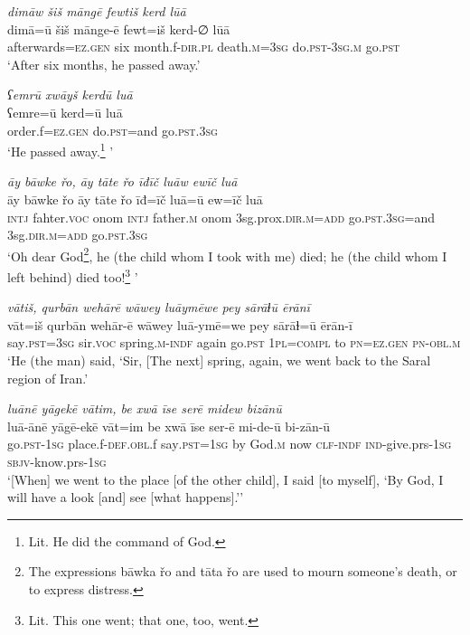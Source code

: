 \ea \label{ZQ.30}
\textit{dimāw šiš māngē fewtiš kerd lūā} \\ 
\gll dimā=ū šiš mānge-ē fewt=iš kerd-∅ lūā \\ 
 afterwards\textsc{=ez.gen} six month.f\textsc{-dir}\textsc{.pl} death\textsc{.m}\textsc{=3sg} do\textsc{.pst}\textsc{-3sg}\textsc{.m} go\textsc{.pst} \\ 
\glt `After six months, he passed away.'
\z 
 
\ea \label{ZQ.31}
\textit{ʕemrū xwāyš kerdū luā} \\ 
\gll ʕemre=ū kerd=ū luā \\ 
 order.f\textsc{=ez.gen} do\textsc{.pst}=and go\textsc{.pst}\textsc{.3sg} \\ 
\glt `He passed away.\footnote{Lit. He did the command of God.} '
\z 
 
\ea \label{ZQ.32}
\textit{āy bāwke řo, āy tāte řo īđīč luāw ewīč luā} \\ 
\gll āy bāwke řo āy tāte řo īđ=īč luā=ū ew=īč luā \\ 
 \textsc{intj} fahter.\textsc{voc} onom \textsc{intj} father\textsc{.m} onom 3sg.prox\textsc{.dir}\textsc{.m}\textsc{=add} go\textsc{.pst}\textsc{.3sg}=and 3sg\textsc{.dir}\textsc{.m}\textsc{=add} go\textsc{.pst}\textsc{.3sg} \\ 
\glt `Oh dear God\footnote{The expressions bāwka řo and tāta řo are used to mourn someone’s death, or to express distress.}, he (the child whom I took with me) died; he (the child whom I left behind) died too!\footnote{Lit. This one went; that one, too, went.} '
\z 
 
\ea \label{ZQ.33}
\textit{vātiš, qurbān wehārē wāwey luāymēwe pey sārāɫū ērānī} \\ 
\gll vāt=iš qurbān wehār-ē wāwey luā-ymē=we pey sārāɫ=ū ērān-ī \\ 
 say\textsc{.pst}\textsc{=3sg} sir.\textsc{voc} spring\textsc{.m}\textsc{-indf} again go\textsc{.pst} \textsc{1pl}\textsc{=compl} to \textsc{pn}\textsc{=ez.gen} \textsc{pn}\textsc{-obl}\textsc{.m} \\ 
\glt `He (the man) said, ‘Sir, [The next] spring, again, we went back to the Saral region of Iran.'
\z 
 
\ea \label{ZQ.35}
\textit{luānē yāgekē vātim, be xwā īse serē midew bizānū} \\ 
\gll luā-ānē yāgē-ekē vāt=im be xwā īse ser-ē mi-de-ū bi-zān-ū \\ 
 go\textsc{.pst}\textsc{-\textsc{1sg}} place.f\textsc{-def}\textsc{.obl}.f say\textsc{.pst}\textsc{=\textsc{1sg}} by God\textsc{.m} now \textsc{clf}\textsc{-indf} \textsc{ind-}give.prs\textsc{-\textsc{1sg}} \textsc{sbjv-}know.prs\textsc{-\textsc{1sg}} \\ 
\glt `[When] we went to the place [of the other child], I said [to myself], ‘By God, I will have a look [and] see [what happens].’'
\z 
 
